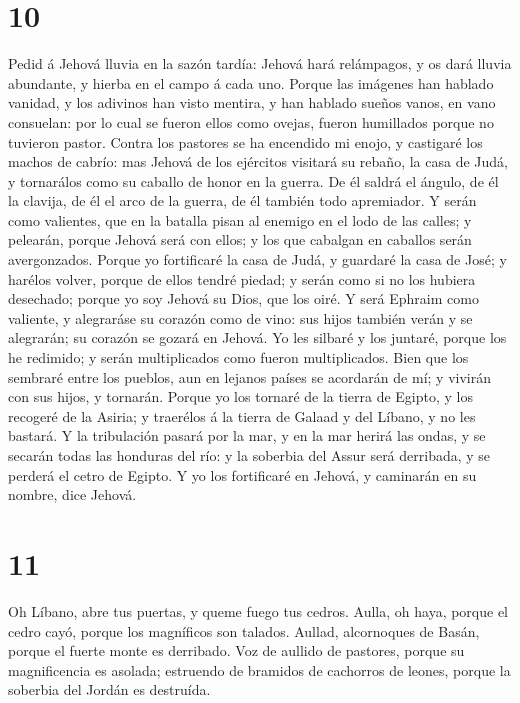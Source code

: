 \hypertarget{section-9}{%
\section{10}\label{section-9}}

 Pedid á Jehová lluvia en la sazón tardía: Jehová hará
relámpagos, y os dará lluvia abundante, y hierba en el campo á cada uno.
 Porque las imágenes han hablado vanidad, y los adivinos han
visto mentira, y han hablado sueños vanos, en vano consuelan: por lo
cual se fueron ellos como ovejas, fueron humillados porque no tuvieron
pastor.  Contra los pastores se ha encendido mi enojo, y
castigaré los machos de cabrío: mas Jehová de los ejércitos visitará su
rebaño, la casa de Judá, y tornarálos como su caballo de honor en la
guerra.  De él saldrá el ángulo, de él la clavija, de él el
arco de la guerra, de él también todo apremiador.  Y serán
como valientes, que en la batalla pisan al enemigo en el lodo de las
calles; y pelearán, porque Jehová será con ellos; y los que cabalgan en
caballos serán avergonzados.  Porque yo fortificaré la casa
de Judá, y guardaré la casa de José; y harélos volver, porque de ellos
tendré piedad; y serán como si no los hubiera desechado; porque yo soy
Jehová su Dios, que los oiré.  Y será Ephraim como valiente,
y alegraráse su corazón como de vino: sus hijos también verán y se
alegrarán; su corazón se gozará en Jehová.  Yo les silbaré y
los juntaré, porque los he redimido; y serán multiplicados como fueron
multiplicados.  Bien que los sembraré entre los pueblos, aun
en lejanos países se acordarán de mí; y vivirán con sus hijos, y
tornarán.  Porque yo los tornaré de la tierra de Egipto, y
los recogeré de la Asiria; y traerélos á la tierra de Galaad y del
Líbano, y no les bastará.  Y la tribulación pasará por la
mar, y en la mar herirá las ondas, y se secarán todas las honduras del
río: y la soberbia del Assur será derribada, y se perderá el cetro de
Egipto.  Y yo los fortificaré en Jehová, y caminarán en su
nombre, dice Jehová.

\hypertarget{section-10}{%
\section{11}\label{section-10}}

 Oh Líbano, abre tus puertas, y queme fuego tus cedros.
 Aulla, oh haya, porque el cedro cayó, porque los magníficos
son talados. Aullad, alcornoques de Basán, porque el fuerte monte es
derribado.  Voz de aullido de pastores, porque su
magnificencia es asolada; estruendo de bramidos de cachorros de leones,
porque la soberbia del Jordán es destruída.

